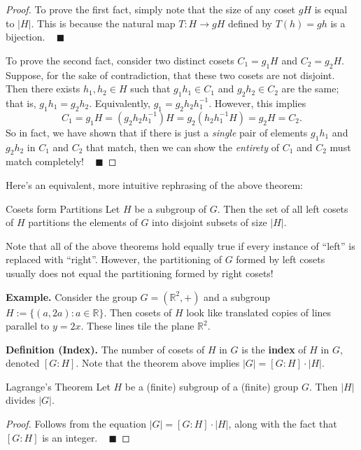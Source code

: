 \begin{proof}
    To prove the first fact, simply note that the size of any coset $gH$ is equal to $|H|$.  This is because the natural map $T: H \to gH$ defined by $T(h) = gh$ is a bijection. ~ $\blacksquare$

    To prove the second fact, consider two distinct cosets $C_1 = g_1H$ and $C_2 = g_2H$.  Suppose, for the sake of contradiction, that these two cosets are not disjoint.  Then there exists $h_1, h_2 \in H$ such that $g_1h_1 \in C_1$ and $g_2h_2 \in C_2$ are the same; that is, $g_1h_1 = g_2h_2$.  Equivalently, $g_1 = g_2h_2h_1^{-1}$.  However, this implies
    \[ C_1 = g_1H = (g_2h_2h_1^{-1})H = g_2(h_2h_1^{-1}H) = g_2H = C_2. \]
    So in fact, we have shown that if there is just a \emph{single} pair of elements $g_1h_1$ and $g_2h_2$ in $C_1$ and $C_2$ that match, then we can show the \emph{entirety} of $C_1$ and $C_2$ must match completely!  ~ $\blacksquare$
\end{proof}

Here's an equivalent, more intuitive rephrasing of the above theorem:

\begin{theorem}{Cosets form Partitions}
    Let $H$ be a subgroup of $G$.  Then the set of all left cosets of $H$ partitions the elements of $G$ into disjoint subsets of size $|H|$.
\end{theorem}

Note that all of the above theorems hold equally true if every instance of ``left'' is replaced with ``right''.  However, the partitioning of $G$ formed by left cosets usually does not equal the partitioning formed by right cosets!

\textbf{Example.} Consider the group $G = (\mathbb{R}^2, +)$ and a subgroup $H := \{(a, 2a): a \in \mathbb{R}\}$.  Then cosets of $H$ look like translated copies of lines parallel to $y = 2x$.  These lines tile the plane $\mathbb{R}^2$.

\textbf{Definition (Index).} The number of cosets of $H$ in $G$ is the \textbf{index} of $H$ in $G$, denoted $[G:H]$.  Note that the theorem above implies $|G| = [G:H] \cdot |H|$.

\begin{theorem}{Lagrange's Theorem}
    Let $H$ be a (finite) subgroup of a (finite) group $G$.  Then $|H|$ divides $|G|$.
\end{theorem}

\begin{proof}
    Follows from the equation $|G| = [G:H] \cdot |H|$, along with the fact that $[G:H]$ is an integer. ~ $\blacksquare$
\end{proof}

